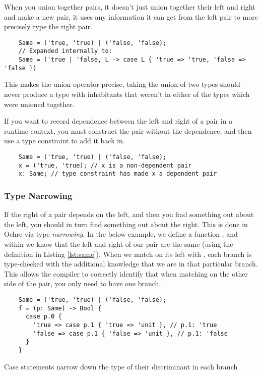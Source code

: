 \documentclass[12pt,twoside]{report}
\begin{document}
When you union together pairs, it doesn't just union together their left and right and make a new pair, it uses any information it can get from the left pair to more precisely type the right pair.

\begin{listing}[H]
  \begin{verbatim}
    Same = ('true, 'true) | ('false, 'false);
    // Expanded internally to:
    Same = ('true | 'false, L -> case L { 'true => 'true, 'false => 'false })
  \end{verbatim}
  \vspace{-0.5em}
  \caption{}
  \label{lst:same}
\end{listing}
\vspace{-1em}

This makes the union operator precise, taking the union of two types should never produce a type with inhabitants that weren't in either of the types which were unioned together.

If you want to record dependence between the left and right of a pair in a runtime context, you must construct the pair without the dependence, and then use a type constraint to add it back in.

\begin{listing}[H]
  \begin{verbatim}
    Same = ('true, 'true) | ('false, 'false);
    x = ('true, 'true); // x is a non-dependent pair
    x: Same; // type constraint has made x a dependent pair
  \end{verbatim}
\end{listing}

\subsubsection{Type Narrowing}
If the right of a pair depends on the left, and then you find something out about the left, you should in turn find something out about the right. This is done in Ochre via type \textit{narrowing}. In the below example, we define a function , and within  we know that the left and right of our pair  are the same (using the definition in Listing \ref{lst:same}). When we match on its left with , each branch is type-checked with the additional knowledge that we are in that particular branch. This allows the compiler to correctly identify that when matching on the other side of the pair, you only need to have one branch.

\begin{listing}[H]
  \begin{verbatim}
    Same = ('true, 'true) | ('false, 'false);
    f = (p: Same) -> Bool {
      case p.0 {
        'true => case p.1 { 'true => 'unit }, // p.1: 'true
        'false => case p.1 { 'false => 'unit }, // p.1: 'false
      }
    }
  \end{verbatim}
  \caption{Case statements narrow down the type of their discriminant in each branch}
\end{listing}
\end{document}
